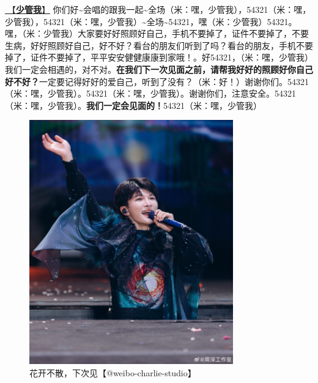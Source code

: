 \documentclass[]{ctexbook}
\begin{document}
\hyperref[watch-ur-manners]{🎵【\textbf{少管我}】} 你们好\textasciitilde 会唱的跟我一起\textasciitilde 全场（米：嘿，少管我），54321（米：嘿，少管我），54321（米：嘿，少管我）\textasciitilde 全场\textasciitilde54321，嘿（米：少管我）54321。嘿，（米：少管我）大家要好好照顾好自己，手机不要掉了，证件不要掉了，不要生病，好好照顾好自己，好不好？看台的朋友们听到了吗？看台的朋友，手机不要掉了，证件不要掉了，平平安安健健康康到家哦！。好54321，（米：嘿，少管我）我们一定会相遇的，对不对。\textbf{在我们下一次见面之前，请帮我好好的照顾好你自己好不好？}一定要记得好好的爱自己，听到了没有？（米：好！）谢谢你们。54321（米：嘿，少管我）。54321（米：嘿，少管我）。谢谢你们，注意安全。54321（米：嘿，少管我）。\textbf{我们一定会见面的！}54321（米：嘿，少管我）

\begin{figure}

{\centering \includegraphics[width=250pt]{img/nanchang-20241123/003} 

}

\caption{花开不散，下次见【@weibo-charlie-studio】}\label{fig:unnamed-chunk-148}
\end{figure}
\end{document}
